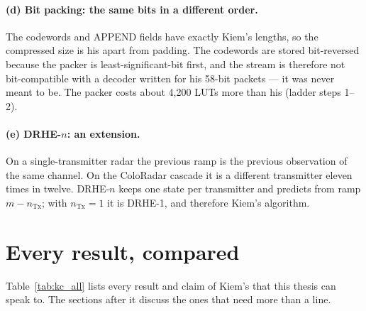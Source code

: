 \paragraph{(d) Bit packing: the same bits in a different order.} The codewords
and APPEND fields have exactly Kiem's lengths, so the compressed size is his
apart from padding. The codewords are stored bit-reversed because the packer is
least-significant-bit first, and the stream is therefore not bit-compatible
with a decoder written for his 58-bit packets --- it was never meant to be.
The packer costs about 4,200 LUTs more than his (ladder steps 1--2).

\paragraph{(e) DRHE-$n$: an extension.} On a single-transmitter radar the
previous ramp is the previous observation of the same channel. On the ColoRadar
cascade it is a different transmitter eleven times in twelve. DRHE-$n$ keeps one
state per transmitter and predicts from ramp $m - n_{\mathrm{Tx}}$; with
$n_{\mathrm{Tx}} = 1$ it is DRHE-1, and therefore Kiem's algorithm.

\section{Every result, compared}
\label{sec:kc_table}

Table~\ref{tab:kc_all} lists every result and claim of Kiem's that this thesis
can speak to. The sections after it discuss the ones that need more than a
line.

